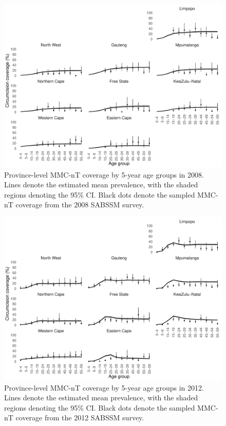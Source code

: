 \documentclass{article}
\begin{document}
\begin{appendix}

\begin{figure}[H]
	\centering
	\includegraphics[width = \linewidth]{Figures/suppmat/ModelFit/MMCnTPrev_5year_Province_2008_withsurveypoints}
	\caption{Province-level MMC-nT coverage by 5-year age groups in 2008. Lines denote the estimated mean prevalence, with the shaded regions denoting the 95\% CI. Black dots denote the sampled MMC-nT coverage from the 2008 SABSSM survey.}
\end{figure}


\begin{figure}[H]
	\centering
	\includegraphics[width = \linewidth]{Figures/suppmat/ModelFit/MMCnTPrev_5year_Province_2012_withsurveypoints}
	\caption{Province-level MMC-nT coverage by 5-year age groups in 2012. Lines denote the estimated mean prevalence, with the shaded regions denoting the 95\% CI. Black dots denote the sampled MMC-nT coverage from the 2012 SABSSM survey.}
\end{figure}


\end{appendix}
\end{document}
